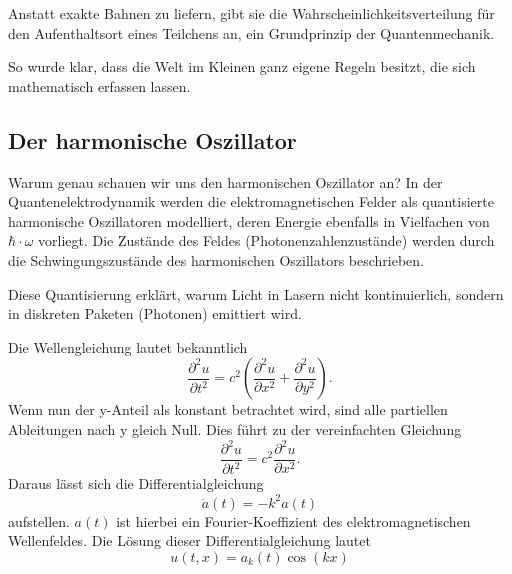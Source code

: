 	
	Anstatt exakte Bahnen zu liefern, gibt sie die Wahrscheinlichkeitsverteilung für den Aufenthaltsort eines Teilchens an, ein Grundprinzip der Quantenmechanik.
	
	So wurde klar, dass die Welt im Kleinen ganz eigene Regeln besitzt, die sich mathematisch erfassen lassen.
	
	
	

\subsection{Der harmonische Oszillator
\label{fourier:subsection:derHarmonischeOszillator}}
Warum genau schauen wir uns den harmonischen Oszillator an?
In der Quantenelektrodynamik werden die elektromagnetischen Felder als quantisierte harmonische Oszillatoren modelliert, deren Energie ebenfalls in Vielfachen von $\hbar\cdot\omega$ vorliegt.
Die Zustände des Feldes (Photonenzahlenzustände) werden durch die Schwingungszustände des harmonischen Oszillators beschrieben.

Diese Quantisierung erklärt, warum Licht in Lasern nicht kontinuierlich, sondern in diskreten Paketen (Photonen) emittiert wird. %

Die Wellengleichung lautet bekanntlich
\begin{equation}
    \frac{\partial^2 u}{\partial t^2} = c^2 \left( \frac{\partial^2 u}{\partial x^2} + \frac{\partial^2 u}{\partial y^2} \right).
\end{equation}
Wenn nun der y-Anteil als konstant betrachtet wird, sind alle partiellen Ableitungen nach y gleich Null.
Dies führt zu der vereinfachten Gleichung
\begin{equation}
    \frac{\partial^2 u}{\partial t^2} = c^2 \frac{\partial^2 u}{\partial x^2}.
\end{equation}
Daraus lässt sich die Differentialgleichung
\begin{equation}
    \ddot{a}(t) = -k^2 a(t)
\end{equation}
aufstellen.
$a(t)$ ist hierbei ein Fourier-Koeffizient des elektromagnetischen Wellenfeldes.
Die Lösung dieser Differentialgleichung lautet
\begin{equation}
    u(t,x) = a_k(t) \cos(kx)
\end{equation}



